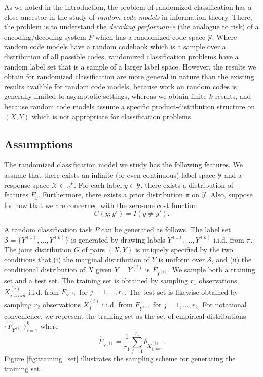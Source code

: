 As we noted in the introduction, the problem of randomized
classification has a close ancestor in the study of \emph{random code
  models} in information theory.  There, the problem is to understand
the \emph{decoding performance} (the analogue to risk) of a
encoding/decoding system $P$ which has a randomized code space
$\mathcal{Y}$.  Where random code models have a random codebook which
is a sample over a distribution of all possible codes, randomized
classification problems have a random label set that is a sample of a
larger label space.  However, the results we obtain for randomized
classification are more general in nature than the existing results
availible for random code models, because work on random codes is
generally limited to asymptotic settings, whereas we obtain finite-$k$
results, and because random code models assume a specific
product-distribution structure on $(X, Y)$ which is not appropriate
for classification problems.

\subsection{Assumptions}

The randomized classification model we study has the following
features.  We assume that there exists an infinite (or even
continuous) label space $\mathcal{Y}$ and a response space
$\mathcal{X} \in \mathbb{R}^p$.  For each label $y \in \mathcal{Y}$,
there exists a distribution of features $F_y$.  Furthermore, there
exists a prior distribution $\pi$ on $\mathcal{Y}$.  Also, suppose for
now that we are concerned with the zero-one cost function
\[
C(y; y') = I(y \neq y').
\]

A random classification task $P$ can be generated as follows.  The
label set $\mathcal{S} = \{Y^{(1)},\hdots, Y^{(k)}\}$ is generated by
drawing labels $Y^{(1)},\hdots, Y^{(k)}$ i.i.d. from $\pi$.  The joint
distribution $G$ of pairs $(X, Y)$ is uniquely specified by the two
conditions that (i) the marginal distribution of $Y$ is uniform over
$\mathcal{S}$, and (ii) the conditional distribution of $X$ given
$Y=Y^{(i)}$ is $F_{Y^{(i)}}$.  We sample both a training set and a
test set.  The training set is obtained by sampling $r_1$
observations $X_{j, train}^{(i)}$ i.i.d. from $F_{Y^{(i)}}$ for $j =
1,\hdots, r_1$.  The test set is likewise obtained by sampling
$r_2$ observations $X_j^{(i)}$ i.i.d. from $F_{Y^{(i)}}$ for $j =
1,\hdots, r_2$.  For notational convenience, we represent the training
set as the set of empirical distributions
$\{\hat{F}_{Y^{(i)}}\}_{i=1}^k$ where
\[
\hat{F}_{Y^{(i)}} = \frac{1}{r_1} \sum_{j=1}^{r_1} \delta_{X^{(i)}_{j, train}}.
\]
Figure \ref{fig:training_set} illustrates the sampling scheme for
generating the training set.

